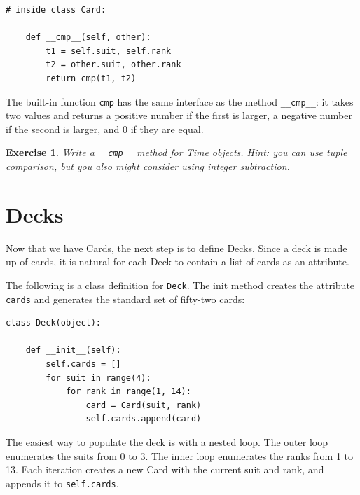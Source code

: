 \documentclass[12pt,a4paper,final,twoside,onecolumn,titlepage]{book}
\newtheorem{exercise}{Exercise}[chapter]
\begin{document}
\begin{verbatim}
# inside class Card:

    def __cmp__(self, other):
        t1 = self.suit, self.rank
        t2 = other.suit, other.rank
        return cmp(t1, t2)
\end{verbatim}
%
The built-in function {\tt cmp} has the same interface as
the method \verb"__cmp__": it takes two values and returns
a positive number if the first is larger, a negative number
if the second is larger, and 0 if they are equal.


\begin{exercise}

Write a \verb"__cmp__" method for Time objects.  Hint: you
can use tuple comparison, but you also might consider using
integer subtraction.



\end{exercise}


\section{Decks}

Now that we have Cards, the next step is to define Decks.  Since a
deck is made up of cards, it is natural for each Deck to contain a
list of cards as an attribute.

The following is a class definition for {\tt Deck}.  The
init method creates the attribute {\tt cards} and generates
the standard set of fifty-two cards:

\begin{verbatim}
class Deck(object):

    def __init__(self):
        self.cards = []
        for suit in range(4):
            for rank in range(1, 14):
                card = Card(suit, rank)
                self.cards.append(card)
\end{verbatim}
%
The easiest way to populate the deck is with a nested loop.  The outer
loop enumerates the suits from 0 to 3.  The inner loop enumerates the
ranks from 1 to 13.  Each iteration
creates a new Card with the current suit and rank,
and appends it to {\tt self.cards}.
\end{document}
